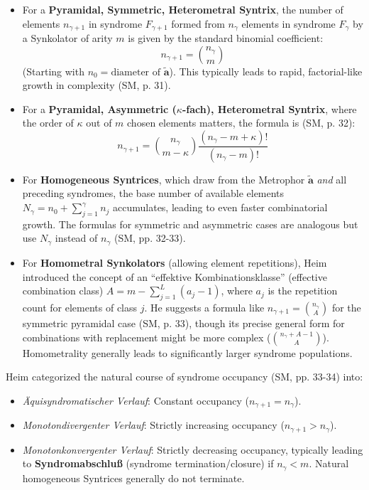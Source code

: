 \documentclass[
    12pt,              %
    a4paper,           %
    headings=normal,   %
    twoside=true,      %
    BCOR=8mm,          %
]{scrbook}
\newcommand{\q}[1]{\enquote{#1}}
\newcommand{\metrophor}{\bm{\widetilde{a}}}
\newcommand{\synkolationsstufe}{m}
\newcommand{\syndrom}{F}
\begin{document}
    \begin{itemize}
        \item   For a \textbf{Pyramidal, Symmetric, Heterometral Syntrix}, the number of elements \(n_{\gamma+1}\) in syndrome \(\syndrom_{\gamma+1}\) formed from \(n_\gamma\) elements in syndrome \(\syndrom_\gamma\) by a Synkolator of arity \(\synkolationsstufe\) is given by the standard binomial coefficient:
            \[ n_{\gamma+1} = \binom{n_\gamma}{\synkolationsstufe} \]
            (Starting with \(n_0 = \text{diameter of } \metrophor\)). This typically leads to rapid, factorial-like growth in complexity (SM, p. 31).
        \item   For a \textbf{Pyramidal, Asymmetric (\(\kappa\)-fach), Heterometral Syntrix}, where the order of \(\kappa\) out of \(\synkolationsstufe\) chosen elements matters, the formula is (SM, p. 32):
            \[ n_{\gamma+1} = \binom{n_\gamma}{\synkolationsstufe-\kappa} \frac{(n_\gamma-\synkolationsstufe+\kappa)!}{(n_\gamma-\synkolationsstufe)!} \]
        \item   For \textbf{Homogeneous Syntrices}, which draw from the Metrophor \(\metrophor\) \textit{and} all preceding syndromes, the base number of available elements \(N_\gamma = n_0 + \sum_{j=1}^\gamma n_j\) accumulates, leading to even faster combinatorial growth. The formulas for symmetric and asymmetric cases are analogous but use \(N_\gamma\) instead of \(n_\gamma\) (SM, pp. 32-33).
        \item   For \textbf{Homometral Synkolators} (allowing element repetitions), Heim introduced the concept of an \q{effektive Kombinationsklasse} (effective combination class) \(A = \synkolationsstufe - \sum_{j=1}^L (a_j - 1)\), where \(a_j\) is the repetition count for elements of class \(j\). He suggests a formula like \(n_{\gamma+1} = \binom{n_\gamma}{A}\) for the symmetric pyramidal case (SM, p. 33), though its precise general form for combinations with replacement might be more complex (\(\binom{n_\gamma+A-1}{A}\)). Homometrality generally leads to significantly larger syndrome populations.
    \end{itemize}
Heim categorized the natural course of syndrome occupancy (SM, pp. 33-34) into:
    \begin{itemize}
        \item   \textit{Äquisyndromatischer Verlauf}: Constant occupancy (\(n_{\gamma+1} = n_\gamma\)).
        \item   \textit{Monotondivergenter Verlauf}: Strictly increasing occupancy (\(n_{\gamma+1} > n_\gamma\)).
        \item   \textit{Monotonkonvergenter Verlauf}: Strictly decreasing occupancy, typically leading to \textbf{Syndromabschluß} (syndrome termination/closure) if \(n_\gamma < \synkolationsstufe\). Natural homogeneous Syntrices generally do not terminate.
    \end{itemize}
\end{document}
